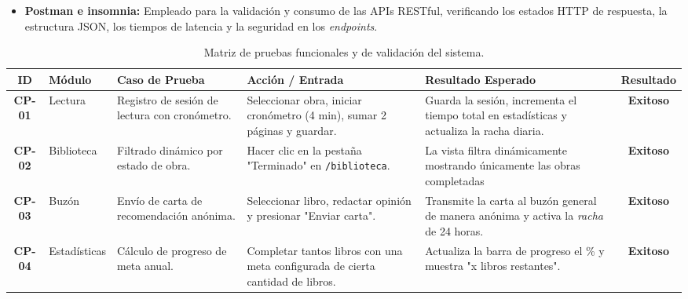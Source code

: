 \documentclass[12pt, atypical, journal]{article}
\begin{document}
\begin{itemize}
	\item \textbf{Postman e insomnia:} Empleado para la validación y consumo de las APIs RESTful, verificando los estados HTTP de respuesta, la estructura JSON, los tiempos de latencia y la seguridad en los \textit{endpoints}.
\end{itemize}

\begin{table}[H]
	\centering
	\small
	\begin{tabular}{|c|l|p{3.5cm}|p{3.5cm}|p{3.5cm}|c|}
		\hline
		\textbf{ID} & \textbf{Módulo} & \textbf{Caso de Prueba} & \textbf{Acción / Entrada} & \textbf{Resultado Esperado} & \textbf{Resultado} \\ \hline
		
		\textbf{CP-01} & Lectura & 
		Registro de sesión de lectura con cronómetro. & 
		Seleccionar obra, iniciar cronómetro (4 min), sumar 2 páginas y guardar. & 
		Guarda la sesión, incrementa el tiempo total en estadísticas y actualiza la racha diaria. & 
		\textbf{Exitoso} \\ \hline
		
		\textbf{CP-02} & Biblioteca & 
		Filtrado dinámico por estado de obra. & 
		Hacer clic en la pestaña "Terminado" en  \texttt{/biblioteca}. & 
		La vista filtra dinámicamente mostrando únicamente las obras completadas & 
		\textbf{Exitoso} \\ \hline
		
		\textbf{CP-03} & Buzón & 
		Envío de carta de recomendación anónima. & 
		Seleccionar libro, redactar opinión y presionar "Enviar carta". & 
		Transmite la carta al buzón general de manera anónima y activa la \textit{racha} de 24 horas. & 
		\textbf{Exitoso} \\ \hline
		
		\textbf{CP-04} & Estadísticas & 
		Cálculo de progreso de meta anual. & 
		Completar tantos libros con una meta configurada de cierta cantidad de libros. & 
		Actualiza la barra de progreso el \% y muestra "x libros restantes". & 
		\textbf{Exitoso} \\ \hline
		
	\end{tabular}
	\caption{Matriz de pruebas funcionales y de validación del sistema.}
	\label{tab:casos_prueba}
\end{table}

\newpage

\end{document}
